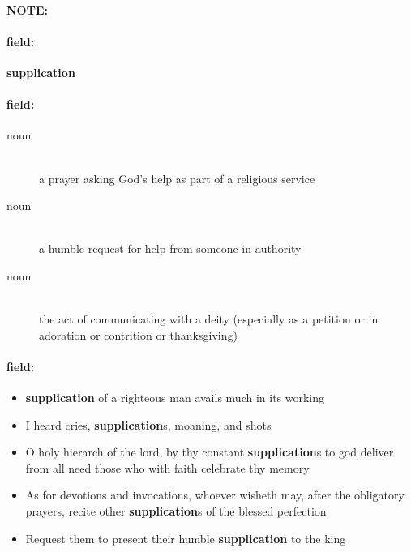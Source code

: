 \documentclass[12pt]{article}
\newenvironment{note}{\paragraph{NOTE:}}{}
\newenvironment{field}{\paragraph{field:}}{}
\begin{document}
\begin{note}
\begin{field}
\textbf{\large supplication}
\end{field}


\begin{field}
\begin{description}
\item[noun] \hfill \\ 
a prayer asking God's help as part of a religious service

\item[noun] \hfill \\ 
a humble request for help from someone in authority

\item[noun] \hfill \\ 
the act of communicating with a deity (especially as a petition or in adoration or contrition or thanksgiving)

\end{description}
\end{field}

\begin{field}
\begin{itemize}
\item \textbf{supplication} of a righteous man avails much in its working
\item I heard cries, \textbf{supplication}s, moaning, and shots
\item O holy hierarch of the lord, by thy constant \textbf{supplication}s to god deliver from all need those who with faith celebrate thy memory
\item As for devotions and invocations, whoever wisheth may, after the obligatory prayers, recite other \textbf{supplication}s of the blessed perfection
\item Request them to present their humble \textbf{supplication} to the king
\end{itemize}
\end{field}
\end{note}
\end{document}
